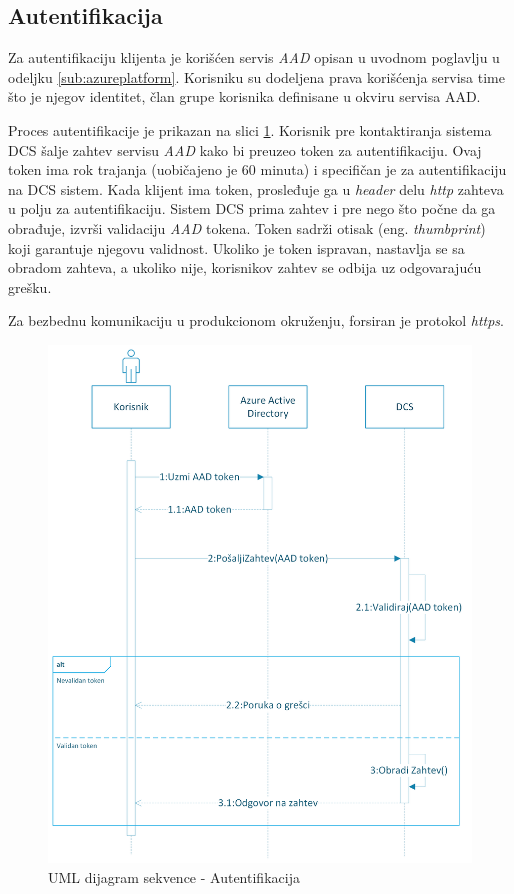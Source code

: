 \documentclass[12pt,oneside]{memoir}
\begin{document}
\subsection{Autentifikacija}

Za autentifikaciju klijenta je korišćen servis \emph{AAD} \cite{AAD} opisan u uvodnom poglavlju u odeljku \ref{sub:azureplatform}. Korisniku su dodeljena prava korišćenja servisa time što je njegov identitet, član grupe korisnika definisane u okviru servisa AAD.

Proces autentifikacije je prikazan na slici \ref{fig:autentifikacija}. Korisnik pre kontaktiranja sistema DCS šalje zahtev servisu \emph{AAD} kako bi preuzeo token za autentifikaciju. Ovaj token ima rok trajanja (uobičajeno je 60 minuta) i specifičan je za autentifikaciju na DCS sistem. Kada klijent ima token, prosleđuje ga u \emph{header} delu \emph{http} zahteva u polju za autentifikaciju. Sistem DCS prima zahtev i pre nego što počne da ga obrađuje, izvrši validaciju \emph{AAD} tokena. Token sadrži otisak (eng. \emph{thumbprint}) koji garantuje njegovu validnost. Ukoliko je token ispravan, nastavlja se sa obradom zahteva, a ukoliko nije, korisnikov zahtev se odbija uz odgovarajuću grešku.

Za bezbednu komunikaciju u produkcionom okruženju, forsiran je protokol \emph{https}.

\begin{figure}[!ht]
  \centering
  \includegraphics[width=1.0\textwidth]{./images/autentikacija_uml_dijagram_sekvence.png}
  \caption{UML dijagram sekvence - Autentifikacija}
  \label{fig:autentifikacija}
\end{figure}
\end{document}
